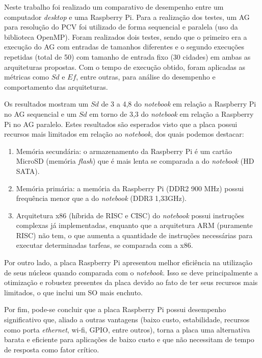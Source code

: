 Neste trabalho foi realizado um comparativo de desempenho entre um computador \textit{desktop} e uma Raspberry Pi. Para a realização dos testes, um AG para resolução do PCV foi utilizado de forma sequencial e paralela (uso da biblioteca OpenMP). Foram realizados dois testes, sendo que o primeiro era a execução do AG com entradas de tamanhos diferentes e o segundo execuções repetidas (total de 50) com tamanho de entrada fixo (30 cidades) em ambas as arquiteturas propostas. Com o tempo de execução obtido, foram aplicadas as métricas como $Sd$ e $Ef$, entre outras, para análise do desempenho e comportamento das arquiteturas.

Os resultados mostram um $Sd$ de 3 a 4,8 do \textit{notebook} em relação a Raspberry Pi no AG sequencial e um $Sd$ em torno de 3,3 do \textit{notebook} em relação a Raspberry Pi no AG paralelo. Estes resultados são esperados visto que a placa possui recursos mais limitados em relação ao \textit{notebook}, dos quais podemos destacar:

\begin{enumerate}
	\item Memória secundária: o armazenamento da Raspberry Pi é um cartão MicroSD (memória \textit{flash}) que é mais lenta se comparada a do \textit{notebook} (HD SATA).
	
	\item Memória primária: a memória da Raspberry Pi (DDR2 900 MHz) possui frequência menor que a do \textit{notebook} (DDR3 1,33GHz).
	
	\item Arquitetura x86 (híbrida de RISC e CISC) do \textit{notebook} possui instruções complexas já implementadas, enquanto que a arquitetura ARM (puramente RISC) não tem, o que aumenta a quantidade de instruções necessárias para executar determinadas tarfeas, se comparada com a x86.
\end{enumerate}

Por outro lado, a placa Raspberry Pi apresentou melhor eficiência na utilização de seus núcleos quando comparada com o \textit{notebook}. Isso se deve principalmente a otimização e robustez presentes da placa devido ao fato de ter seus recursos mais limitados, o que inclui um SO mais enchuto.

Por fim, pode-se concluir que a placa Raspberry Pi possui desempenho significativo que, aliado a outras vantagens (baixo custo, estabilidade, recursos como porta \textit{ethernet}, wi-fi, GPIO, entre outros), torna a placa uma alternativa barata e eficiente para aplicações de baixo custo e que não necessitam de tempo de resposta como fator crítico.

